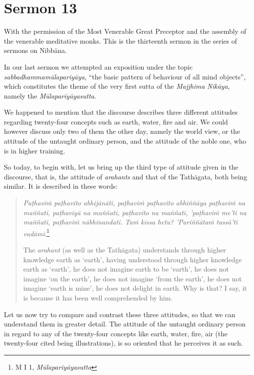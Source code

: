 \chapter{Sermon 13}

\NibbanaOpeningQuote

With the permission of the Most Venerable Great Preceptor and the assembly of the venerable meditative monks. This is the thirteenth sermon in the series of sermons on Nibbāna.

In our last sermon we attempted an exposition under the topic \emph{sabbadhammamūlapariyāya}, ``the basic pattern of behaviour of all mind objects'', which constitutes the theme of the very first sutta of the \emph{Majjhima Nikāya}, namely the \emph{Mūlapariyāyasutta}.

We happened to mention that the discourse describes three different attitudes regarding twenty-four concepts such as earth, water, fire and air. We could however discuss only two of them the other day, namely the world view, or the attitude of the untaught ordinary person, and the attitude of the noble one, who is in higher training.

So today, to begin with, let us bring up the third type of attitude given in the discourse, that is, the attitude of \emph{arahants} and that of the Tathāgata, both being similar. It is described in these words:

\begin{quote}
\emph{Paṭhaviṁ paṭhavito abhijānāti, paṭhaviṁ paṭhavito abhiññāya paṭhaviṁ na maññati, paṭhaviyā na maññati, paṭhavito na maññati, 'paṭhaviṁ me'ti na maññati, paṭhaviṁ nābhinandati. Taṁ kissa hetu? 'Pariññātaṁ tassā'ti vadāmi}.\footnote{M I 1, \emph{Mūlapariyāyasutta}}

The \emph{arahant} (as well as the Tathāgata) understands through higher knowledge earth as `earth', having understood through higher knowledge earth as `earth', he does not imagine earth to be `earth', he does not imagine `on the earth', he does not imagine `from the earth', he does not imagine `earth is mine', he does not delight in earth. Why is that? I say, it is because it has been well comprehended by him.
\end{quote}

Let us now try to compare and contrast these three attitudes, so that we can understand them in greater detail. The attitude of the untaught ordinary person in regard to any of the twenty-four concepts like earth, water, fire, air (the twenty-four cited being illustrations), is so oriented that he perceives it as such.

